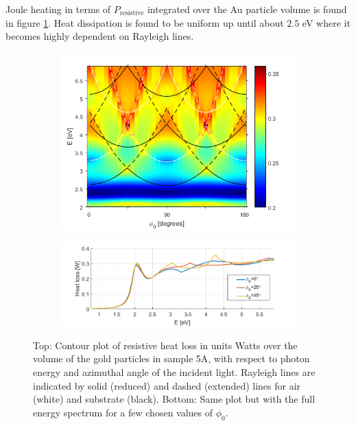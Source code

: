 Joule heating in terms of $P_{\text{resistive}}$ integrated over the Au particle volume is found in figure \ref{fig:S5A_heatloss}. Heat dissipation is found to be uniform up until about $2.5$ eV where it becomes highly dependent on Rayleigh lines. %

\begin{figure}[h!]  %
    \begin{subfigure}{\textwidth}
        \centering
        \includegraphics[width=0.6\linewidth, trim=0cm 0cm 0cm 0cm, clip]{figures/ch4/S5A/heatloss/S5A_heat_loss_noscaling.png}
    \end{subfigure}
    
    \begin{subfigure}{\textwidth}
        \centering
        \includegraphics[width=0.5\linewidth, trim=0cm 0cm 0cm 0cm, clip]{figures/ch4/S5A/heatloss/S5A_heat_loss_phi=0,25,45(1).png}
    \end{subfigure}
    
    \caption{Top: Contour plot of resistive heat loss in units Watts over the volume of the gold particles in sample 5A, with respect to photon energy and azimuthal angle of the incident light. Rayleigh lines are indicated by solid (reduced) and dashed (extended) lines for air (white) and substrate (black). Bottom: Same plot but with the full energy spectrum for a few chosen values of $\phi_0$.}
    \label{fig:S5A_heatloss}
\end{figure}

